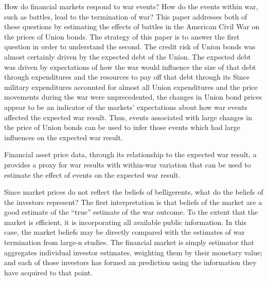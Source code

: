 How do financial markets respond to war events?
How do the events within war, such as battles, lead to the termination of war?
This paper addresses both of these questions by estimating the effects of battles in the American Civil War on the prices of Union bonds.
The strategy of this paper is to answer the first question in order to understand the second.
The credit risk of Union bonds was almost certainly driven by the expected debt of the Union.
The expected debt was driven by expectations of how the war would influence the size of that debt through expenditures and the resources to pay off that debt through its
Since military expenditures accounted for almost all Union expenditures and the price movements during the war were unprecedented, the changes in Union bond prices appear to be an indicator of the markets' expectations about how war events affected the expected war result.
Thus, events associated with large changes in the price of Union bonds can be used to infer those events which had large influences on the expected war result.

Financial asset price data, through its relationship to the expected war result, a provides a proxy for war results with within-war variation that can be used to estimate the effect of events on the expected war result.



Since market prices do not reflect the beliefs of belligerents, what do the beliefs of the investors represent? The first interpretation is that beliefs of the market are a good estimate of the ``true'' estimate of the war outcome.
To the extent that the market is efficient, it is incorporating all available public information.
In this case, the market beliefs may be directly compared with the estimates of war termination from large-n studies.
The financial market is simply estimator that aggregates individual investor estimates, weighting them by their monetary value;
and each of those investors has formed an prediction using the information they have acquired to that point.

